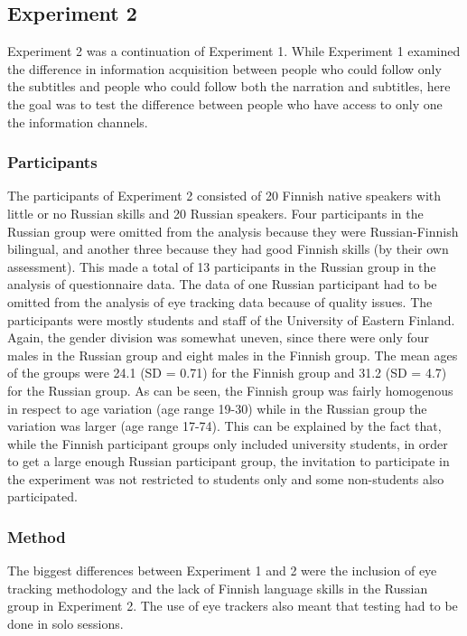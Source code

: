 \documentclass[output=paper]{langsci/langscibook}
\begin{document}
\subsection{Experiment 2}

Experiment 2 was a continuation of Experiment 1. While Experiment 1 examined the difference in information acquisition between people who could follow only the subtitles and people who could follow both the narration and subtitles, here the goal was to test the difference between people who have access to only one the information channels. 

\subsubsection{Participants}

The participants of Experiment 2 consisted of 20 Finnish native speakers with little or no Russian skills and 20 Russian speakers. Four participants in the Russian group were omitted from the analysis because they were Russian-Finnish bilingual, and another three because they had good Finnish skills (by their own assessment). This made a total of 13 participants in the Russian group in the analysis of questionnaire data. The data of one Russian participant had to be omitted from the analysis of eye tracking data because of quality issues. The participants were mostly students and staff of the University of Eastern Finland. Again, the gender division was somewhat uneven, since there were only four males in the Russian group and eight males in the Finnish group. The mean ages of the groups were 24.1 (SD = 0.71) for the Finnish group and 31.2 (SD = 4.7) for the Russian group. As can be seen, the Finnish group was fairly homogenous in respect to age variation (age range 19-30) while in the Russian group the variation was larger (age range 17-74). This can be explained by the fact that, while the Finnish participant groups only included university students, in order to get a large enough Russian participant group, the invitation to participate in the experiment was not restricted to students only and some non-students also participated. 

\subsubsection{Method}

The biggest differences between Experiment 1 and 2 were the inclusion of eye tracking methodology and the lack of Finnish language skills in the Russian group in Experiment 2. The use of eye trackers also meant that testing had to be done in solo sessions.
\end{document}
